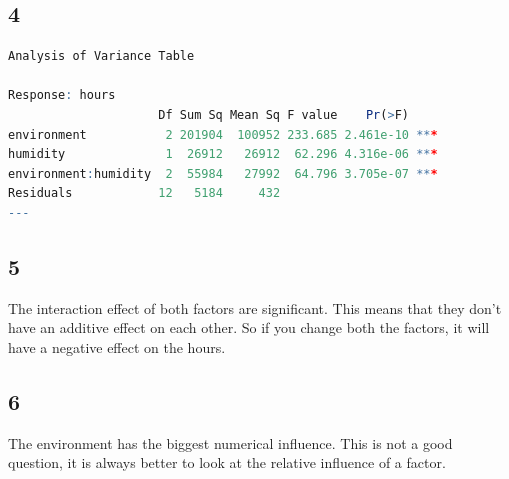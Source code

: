 \documentclass{article}
\begin{document}
    \subsection*{4}
      \begin{lstlisting}[language=R]
Analysis of Variance Table

Response: hours
                     Df Sum Sq Mean Sq F value    Pr(>F)    
environment           2 201904  100952 233.685 2.461e-10 ***
humidity              1  26912   26912  62.296 4.316e-06 ***
environment:humidity  2  55984   27992  64.796 3.705e-07 ***
Residuals            12   5184     432                      
---
      \end{lstlisting}
    
    \subsection*{5}
      The interaction effect of both factors are significant.
      This means that they don't have an additive effect on each other.
      So if you change both the factors, it will have a negative effect on the hours.
    
    \subsection*{6}
      The environment has the biggest numerical influence.
      This is not a good question, it is always better to look at the relative influence of a factor.
    
\end{document}
